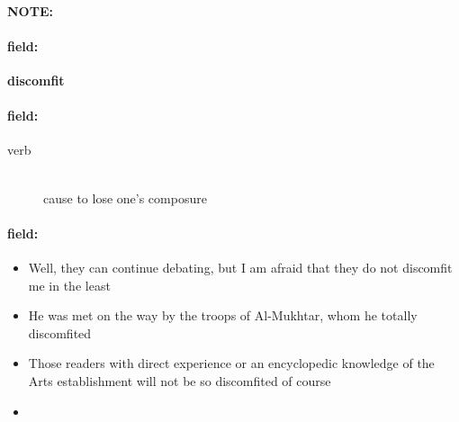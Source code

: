 \documentclass[12pt]{article}
\newenvironment{note}{\paragraph{NOTE:}}{}
\newenvironment{field}{\paragraph{field:}}{}
\begin{document}
\begin{note}
\begin{field}
\textbf{\large discomfit}
\end{field}


\begin{field}
\begin{description}
\item[verb] \hfill \\ 
cause to lose one's composure

\end{description}
\end{field}

\begin{field}
\begin{itemize}
\item Well, they can continue debating, but I am afraid that they do not discomfit me in the least
\item He was met on the way by the troops of Al-Mukhtar, whom he totally discomfited
\item Those readers with direct experience or an encyclopedic knowledge of the Arts establishment will not be so discomfited of course
\item 
\end{itemize}
\end{field}
\end{note}
\end{document}
